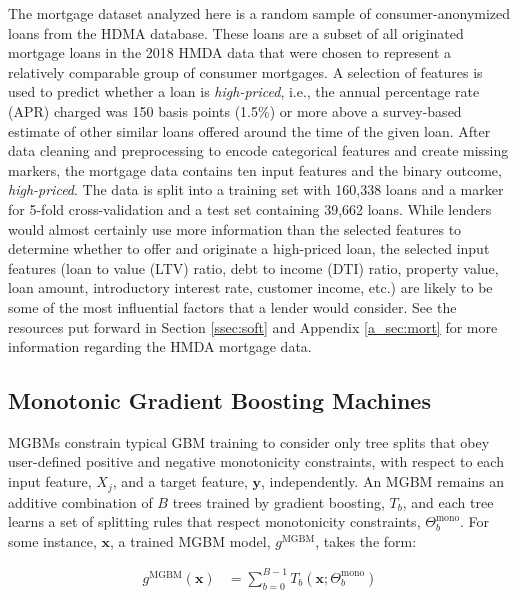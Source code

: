 \documentclass[information,article,submit,moreauthors,pdftex]{definitions/mdpi}
\begin{document}
The mortgage dataset analyzed here is a random sample of consumer-anonymized loans from the HDMA database. These loans are a subset of all originated mortgage loans in the 2018 HMDA data that were chosen to represent a relatively comparable group of consumer mortgages.  A selection of features is used to predict whether a loan is \textit{high-priced}, i.e., the annual percentage rate (APR) charged was 150 basis points (1.5\%) or more above a survey-based estimate of other similar loans offered around the time of the given loan.  After data cleaning and preprocessing to encode categorical features and create missing markers, the mortgage data contains ten input features and the binary outcome, \textit{high-priced}. The data is split into a training set with 160,338 loans and a marker for 5-fold cross-validation and a test set containing 39,662 loans. While lenders would almost certainly use more information than the selected features to determine whether to offer and originate a high-priced loan, the selected input features (loan to value (LTV) ratio, debt to income (DTI) ratio, property value, loan amount, introductory interest rate, customer income, etc.) are likely to be some of the most influential factors that a lender would consider. See the resources put forward in Section \ref{ssec:soft} and Appendix \ref{a_sec:mort} for more information regarding the HMDA mortgage data.

\subsection{Monotonic Gradient Boosting Machines}\label{ssec:mgbm}

MGBMs constrain typical GBM training to consider only tree splits that obey user-defined positive and negative monotonicity constraints, with respect to each input feature, $X_j$, and a target feature, $\mathbf{y}$, independently. An MGBM remains an additive combination of $B$ trees trained by gradient boosting, $T_b$, and each tree learns a set of splitting rules that respect monotonicity constraints,  $\Theta^\text{mono}_b$. For some instance, $\mathbf{x}$, a trained MGBM model, $g^{\text{MGBM}}$, takes the form:

\begin{equation}
\begin{aligned}\label{eq:gbm}
g^{\text{MGBM}}(\mathbf{x}) &= \sum_{b=0}^{B-1} T_b\left(\mathbf{x}; \Theta^\text{mono}_b\right)
\end{aligned}
\end{equation}
\end{document}
